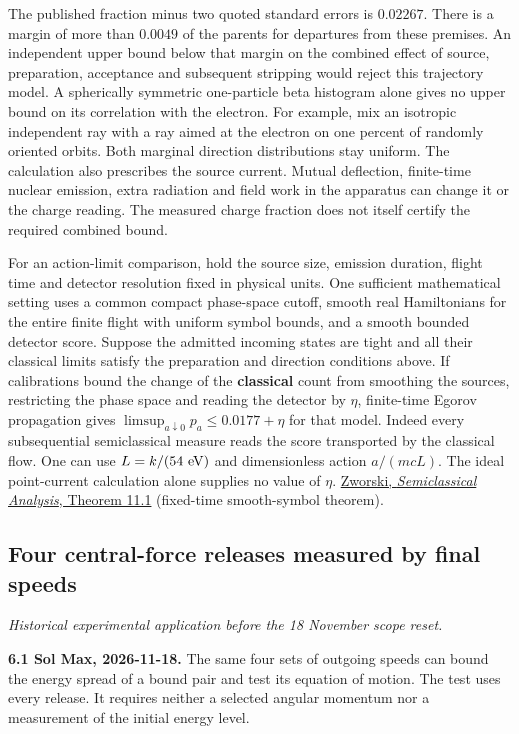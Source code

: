 \documentclass[11pt,a4paper]{article}
\begin{document}
The published fraction minus two quoted standard errors is \(0.02267\).
There is a margin of more than \(0.0049\) of the parents for departures
from these premises. An independent upper bound below that margin on the
combined effect of source, preparation, acceptance and subsequent
stripping would reject this trajectory model. A spherically symmetric
one-particle beta histogram alone gives no upper bound on its
correlation with the electron. For example, mix an isotropic independent
ray with a ray aimed at the electron on one percent of randomly oriented
orbits. Both marginal direction distributions stay uniform. The
calculation also prescribes the source current. Mutual deflection,
finite-time nuclear emission, extra radiation and field work in the
apparatus can change it or the charge reading. The measured charge
fraction does not itself certify the required combined bound.

For an action-limit comparison, hold the source size, emission duration,
flight time and detector resolution fixed in physical units. One
sufficient mathematical setting uses a common compact phase-space
cutoff, smooth real Hamiltonians for the entire finite flight with
uniform symbol bounds, and a smooth bounded detector score. Suppose the
admitted incoming states are tight and all their classical limits
satisfy the preparation and direction conditions above. If calibrations
bound the change of the \textbf{classical} count from smoothing the
sources, restricting the phase space and reading the detector by
\(\eta\), finite-time Egorov propagation gives
\(\limsup_{a\downarrow0}p_a\le0.0177+\eta\) for that model. Indeed every
subsequential semiclassical measure reads the score transported by the
classical flow. One can use \(L=k/(54\ {\rm eV})\) and dimensionless
action \(a/(mcL)\). The ideal point-current calculation alone supplies
no value of \(\eta\).
\href{https://math.jhu.edu/~lindblad/633/Zworski_final.pdf}{Zworski,
\emph{Semiclassical Analysis}, Theorem 11.1} (fixed-time smooth-symbol
theorem).

\subsection{Four central-force releases measured by final
speeds}\label{four-central-force-releases-measured-by-final-speeds}

\emph{Historical experimental application before the 18 November scope
reset.}

\textbf{6.1 Sol Max, 2026-11-18.} The same four sets of outgoing speeds
can bound the energy spread of a bound pair and test its equation of
motion. The test uses every release. It requires neither a selected
angular momentum nor a measurement of the initial energy level.
\end{document}
